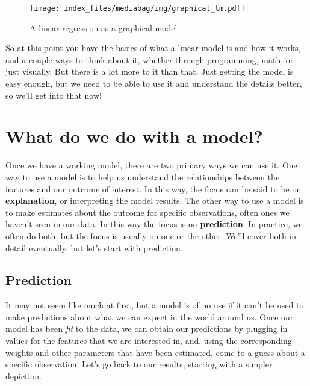 \documentclass[
  letterpaper,
]{krantz}
\begin{document}
\begin{figure}

{\centering \texttt{[image: index\_files/mediabag/img/graphical\_lm.pdf]}

}

\caption{\label{fig-graph-lm}A linear regression as a graphical model}

\end{figure}

So at this point you have the basics of what a linear model is and how
it works, and a couple ways to think about it, whether through
programming, math, or just visually. But there is a lot more to it than
that. Just getting the model is easy enough, but we need to be able to
use it and understand the details better, so we'll get into that now!

\section{What do we do with a model?}\label{sec-lm-what-do-we-do}

Once we have a working model, there are two primary ways we can use it.
One way to use a model is to help us understand the relationships
between the features and our outcome of interest. In this way, the focus
can be said to be on \textbf{explanation}, or interpreting the model
results. The other way to use a model is to make estimates about the
outcome for specific observations, often ones we haven't seen in our
data. In this way the focus is on \textbf{prediction}. In practice, we
often do both, but the focus is usually on one or the other. We'll cover
both in detail eventually, but let's start with prediction.

\subsection{Prediction}\label{sec-lm-prediction}

It may not seem like much at first, but a model is of no use if it can't
be used to make predictions about what we can expect in the world around
us. Once our model has been \emph{fit} to the data, we can obtain our
predictions by plugging in values for the features that we are
interested in, and, using the corresponding weights and other parameters
that have been estimated, come to a guess about a specific observation.
Let's go back to our results, starting with a simpler depiction.

\small
\end{document}
